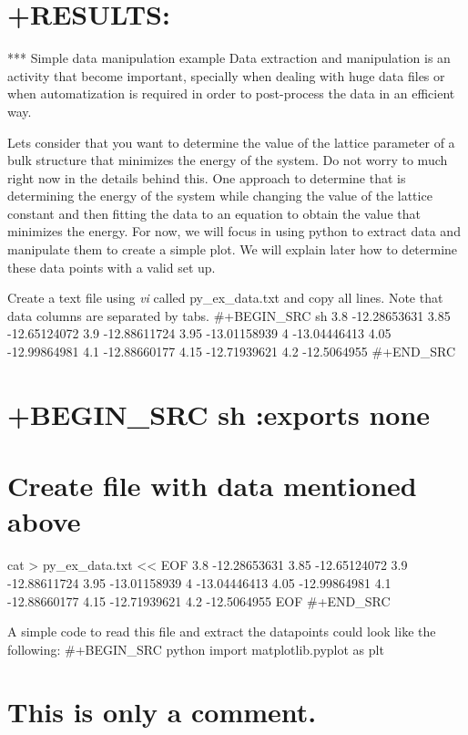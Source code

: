 \documentclass[11pt]{article}
\begin{document}
\section{+RESULTS:}\label{results-9}

*** Simple data manipulation example Data extraction and manipulation is
an activity that become important, specially when dealing with huge data
files or when automatization is required in order to post-process the
data in an efficient way.

Lets consider that you want to determine the value of the lattice
parameter of a bulk structure that minimizes the energy of the system.
Do not worry to much right now in the details behind this. One approach
to determine that is determining the energy of the system while changing
the value of the lattice constant and then fitting the data to an
equation to obtain the value that minimizes the energy. For now, we will
focus in using python to extract data and manipulate them to create a
simple plot. We will explain later how to determine these data points
with a valid set up.

Create a text file using \emph{vi} called py\_ex\_data.txt and copy all
lines. Note that data columns are separated by tabs. \#+BEGIN\_SRC sh
3.8 -12.28653631 3.85 -12.65124072 3.9 -12.88611724 3.95 -13.01158939 4
-13.04446413 4.05 -12.99864981 4.1 -12.88660177 4.15 -12.71939621 4.2
-12.5064955 \#+END\_SRC

\section{+BEGIN\_SRC sh :exports none}\label{begin_src-sh-exports-none}

\section{Create file with data mentioned
above}\label{create-file-with-data-mentioned-above}

cat \textgreater{} py\_ex\_data.txt \textless{}\textless{} EOF 3.8
-12.28653631 3.85 -12.65124072 3.9 -12.88611724 3.95 -13.01158939 4
-13.04446413 4.05 -12.99864981 4.1 -12.88660177 4.15 -12.71939621 4.2
-12.5064955 EOF \#+END\_SRC

A simple code to read this file and extract the datapoints could look
like the following: \#+BEGIN\_SRC python import matplotlib.pyplot as plt

\section{This is only a comment.}\label{this-is-only-a-comment.}
\end{document}

